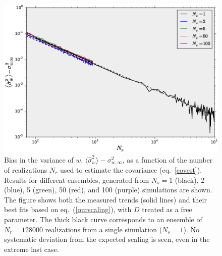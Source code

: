 \documentclass[reprint,aps,prd,superscriptaddress,showkeys,showpacs]{revtex4-1}
\newcommand{\h}[1]{\hat{#1}}
\begin{document}
\begin{figure}
\includegraphics[scale=0.3]{Figures/scaling_nr.eps}
\caption{Bias in the variance of $w$,
  $\langle\h{\sigma}^2_w\rangle-\sigma^2_{w,\infty}$, as a function of
  the number of realizations $N_r$ used to estimate the covariance
  (eq.~\ref{covest}). Results for different ensembles, generated from
  $N_s=$1 (black), 2 (blue), 5 (green), 50 (red), and 100 (purple)
  simulations are shown. The figure shows both the measured trends
  (solid lines) and their best fits based on eq.~(\ref{ourscaling}),
  with $D$ treated as a free parameter.
  The thick black curve corresponds to an ensemble of $N_r=128000$
  realizations from a single simulation ($N_s=1$).
  No systematic deviation from the expected scaling is seen, even in
  the extreme last case.  }
\label{wvar_nr}
\end{figure}
\end{document}
